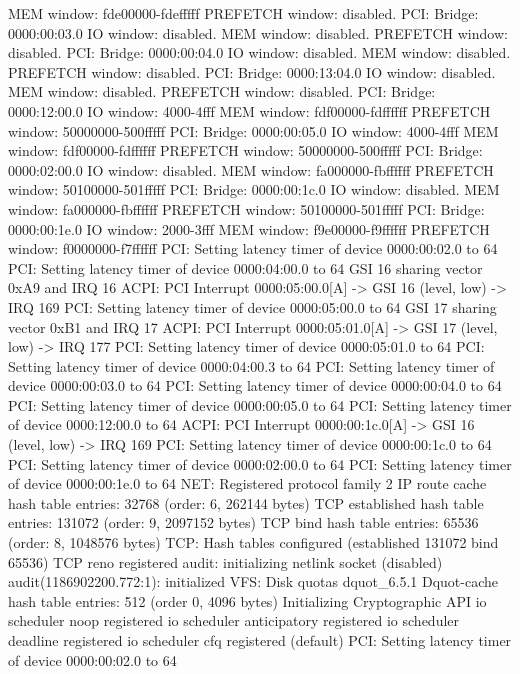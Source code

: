 \documentclass[mingoth,a4paper]{jsarticle}
\begin{document}
{{{{{{{{\begin{commandline}
  MEM window: fde00000-fdefffff
  PREFETCH window: disabled.
PCI: Bridge: 0000:00:03.0
  IO window: disabled.
  MEM window: disabled.
  PREFETCH window: disabled.
PCI: Bridge: 0000:00:04.0
  IO window: disabled.
  MEM window: disabled.
  PREFETCH window: disabled.
PCI: Bridge: 0000:13:04.0
  IO window: disabled.
  MEM window: disabled.
  PREFETCH window: disabled.
PCI: Bridge: 0000:12:00.0
  IO window: 4000-4fff
  MEM window: fdf00000-fdffffff
  PREFETCH window: 50000000-500fffff
PCI: Bridge: 0000:00:05.0
  IO window: 4000-4fff
  MEM window: fdf00000-fdffffff
  PREFETCH window: 50000000-500fffff
PCI: Bridge: 0000:02:00.0
  IO window: disabled.
  MEM window: fa000000-fbffffff
  PREFETCH window: 50100000-501fffff
PCI: Bridge: 0000:00:1c.0
  IO window: disabled.
  MEM window: fa000000-fbffffff
  PREFETCH window: 50100000-501fffff
PCI: Bridge: 0000:00:1e.0
  IO window: 2000-3fff
  MEM window: f9e00000-f9ffffff
  PREFETCH window: f0000000-f7ffffff
PCI: Setting latency timer of device 0000:00:02.0 to 64
PCI: Setting latency timer of device 0000:04:00.0 to 64
GSI 16 sharing vector 0xA9 and IRQ 16
ACPI: PCI Interrupt 0000:05:00.0[A] -> GSI 16 (level, low) -> IRQ 169
PCI: Setting latency timer of device 0000:05:00.0 to 64
GSI 17 sharing vector 0xB1 and IRQ 17
ACPI: PCI Interrupt 0000:05:01.0[A] -> GSI 17 (level, low) -> IRQ 177
PCI: Setting latency timer of device 0000:05:01.0 to 64
PCI: Setting latency timer of device 0000:04:00.3 to 64
PCI: Setting latency timer of device 0000:00:03.0 to 64
PCI: Setting latency timer of device 0000:00:04.0 to 64
PCI: Setting latency timer of device 0000:00:05.0 to 64
PCI: Setting latency timer of device 0000:12:00.0 to 64
ACPI: PCI Interrupt 0000:00:1c.0[A] -> GSI 16 (level, low) -> IRQ 169
PCI: Setting latency timer of device 0000:00:1c.0 to 64
PCI: Setting latency timer of device 0000:02:00.0 to 64
PCI: Setting latency timer of device 0000:00:1e.0 to 64
NET: Registered protocol family 2
IP route cache hash table entries: 32768 (order: 6, 262144 bytes)
TCP established hash table entries: 131072 (order: 9, 2097152 bytes)
TCP bind hash table entries: 65536 (order: 8, 1048576 bytes)
TCP: Hash tables configured (established 131072 bind 65536)
TCP reno registered
audit: initializing netlink socket (disabled)
audit(1186902200.772:1): initialized
VFS: Disk quotas dquot_6.5.1
Dquot-cache hash table entries: 512 (order 0, 4096 bytes)
Initializing Cryptographic API
io scheduler noop registered
io scheduler anticipatory registered
io scheduler deadline registered
io scheduler cfq registered (default)
PCI: Setting latency timer of device 0000:00:02.0 to 64

\end{commandline}}}}}}}}}
\end{document}
